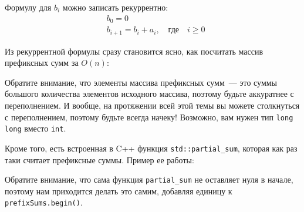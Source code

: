 \begin{observation}
    Формулу для $b_i$ можно записать рекуррентно:
\begin{align*}
&    b_0 = 0\\
&    b_{i + 1} = b_{i} + a_{i}, \quad \text{где} \quad i \ge 0
\end{align*}
\end{observation}

Из рекуррентной формулы сразу становится ясно, как посчитать массив префиксных сумм за $O(n)$:


\begin{observation}
    Обратите внимание, что элементы массива префиксных сумм~--- это суммы большого количества элементов исходного массива, поэтому будьте аккуратнее с переполнением. И вообще, на протяжении всей этой темы вы можете столкнуться с переполнением, поэтому будьте всегда начеку! Возможно, вам нужен тип \verb+long long+ вместо \verb+int+.
\end{observation}

Кроме того, есть встроенная в C++ функция \verb+std::partial_sum+, которая как раз таки считает префиксные суммы. Пример ее работы:


Обратите внимание, что сама функция \verb+partial_sum+ не оставляет нуля в начале, поэтому нам приходится делать это самим, добавляя единицу к \verb+prefixSums.begin()+.

